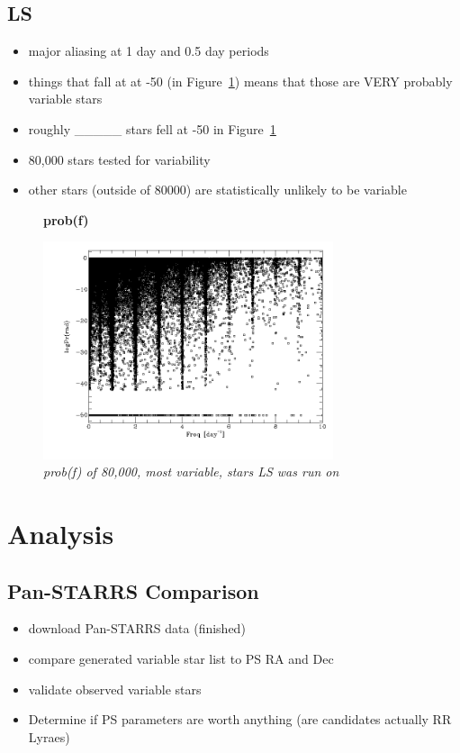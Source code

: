 \documentclass[aps,prl,twocolumn,superscriptaddress]{revtex4-1}
\begin{document}
\subsection{LS}
\begin{itemize}
 \item{} major aliasing at 1 day and 0.5 day periods
 \item{} things that fall at at -50 (in Figure~\ref{fig:quartiles}) means that those are VERY probably variable stars
 \item{} roughly \_\_\_\_\_ stars fell at -50 in Figure~\ref{fig:quartiles}
 \item{} 80,000 stars tested for variability
 \item{} other stars (outside of 80000) are statistically unlikely to be variable
\end{itemize}

\begin{figure}[H]
 \centering
 \textbf{prob(f)}\par\medskip
 	\includegraphics[width=3.35in]{figures/fromJT/probf.png}
 \caption{\it \small{prob(f) of 80,000, most variable, stars LS was run on}}
 \label{fig:quartiles}
\end{figure}




\section{Analysis}

\subsection{Pan-STARRS Comparison}
\begin{itemize}
	\item{} download Pan-STARRS data (finished)
	\item{} compare generated variable star list to PS RA and Dec
	\item{} validate observed variable stars
	\item{} Determine if PS parameters are worth anything (are candidates actually RR Lyraes)
\end{itemize}
\end{document}
